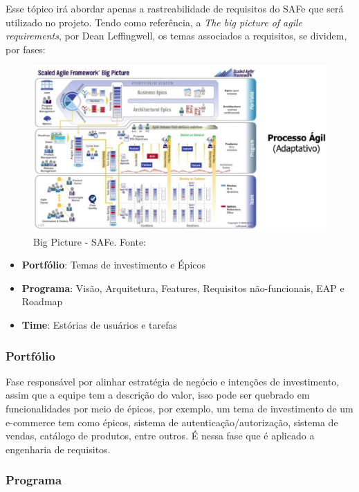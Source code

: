 Esse tópico irá abordar apenas a rastreabilidade de requisitos do SAFe que será utilizado no projeto. Tendo como
referência, a \textit{The big picture of agile requirements}, por Dean Leffingwell, os temas associados a requisitos, se
dividem, por fases: \cite{safe}

\begin{figure}[h!]
	\centering
  \includegraphics[keepaspectratio=true,scale=0.5]{figuras/safe.eps}
  \caption[Big Picture - SAFe]{Big Picture - SAFe. Fonte: \cite{safe}}
	\label{fig:safe}
\end{figure}

\begin{itemize}
  \item \textbf{Portfólio}: Temas de investimento e Épicos
  \item \textbf{Programa}: Visão, Arquitetura, Features, Requisitos não-funcionais, EAP e Roadmap
  \item \textbf{Time}: Estórias de usuários e tarefas
\end{itemize}

\subsubsection{Portfólio}

Fase responsável por alinhar estratégia de negócio e intenções de investimento, assim que a equipe tem a descrição do valor, isso pode ser quebrado em funcionalidades por meio de épicos, por exemplo, um tema de investimento de um e-commerce tem como épicos, sistema de autenticação/autorização, sistema de vendas, catálogo de produtos, entre outros. É nessa fase que é aplicado a engenharia de requisitos.

\subsubsection{Programa}

